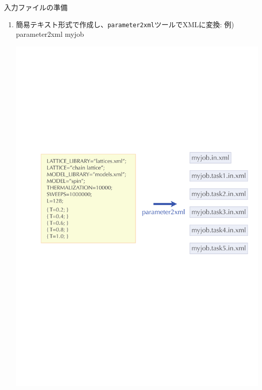 \begin{frame}[t,fragile]{入力ファイルの準備}
  \begin{enumerate}
    \setlength{\itemsep}{1em}
    \setcounter{enumi}{1}
  \item 簡易テキスト形式で作成し、{\tt parameter2xml}ツールでXMLに変換: 例) parameter2xml myjob
    \begin{center}
      \includegraphics[height=.6\textheight]{simulation4.pdf}
    \end{center}
  \end{enumerate}
\end{frame}

